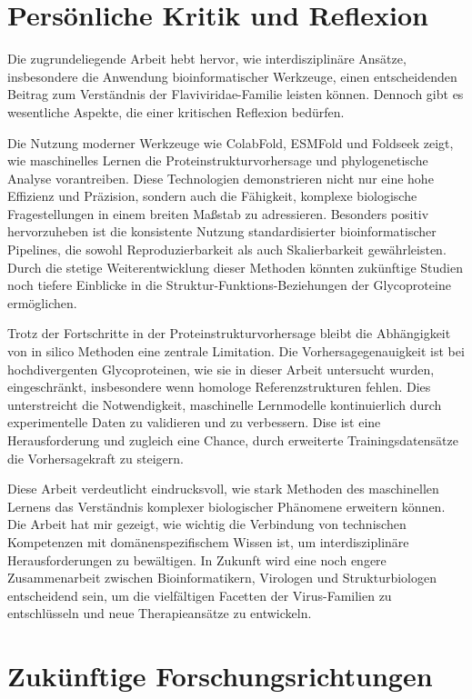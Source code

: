 \section{Persönliche Kritik und Reflexion} \label{sec:persoenliche-kritik}

Die zugrundeliegende Arbeit hebt hervor, wie interdisziplinäre Ansätze, insbesondere die Anwendung bioinformatischer Werkzeuge, einen entscheidenden Beitrag zum Verständnis der Flaviviridae-Familie leisten können. Dennoch gibt es wesentliche Aspekte, die einer kritischen Reflexion bedürfen.

Die Nutzung moderner Werkzeuge wie ColabFold, ESMFold und Foldseek zeigt, wie maschinelles Lernen die Proteinstrukturvorhersage und phylogenetische Analyse vorantreiben. Diese Technologien demonstrieren nicht nur eine hohe Effizienz und Präzision, sondern auch die Fähigkeit, komplexe biologische Fragestellungen in einem breiten Maßstab zu adressieren. Besonders positiv hervorzuheben ist die konsistente Nutzung standardisierter bioinformatischer Pipelines, die sowohl Reproduzierbarkeit als auch Skalierbarkeit gewährleisten. Durch die stetige Weiterentwicklung dieser Methoden könnten zukünftige Studien noch tiefere Einblicke in die Struktur-Funktions-Beziehungen der Glycoproteine ermöglichen.

Trotz der Fortschritte in der Proteinstrukturvorhersage bleibt die Abhängigkeit von in silico Methoden eine zentrale Limitation. Die Vorhersagegenauigkeit ist bei hochdivergenten Glycoproteinen, wie sie in dieser Arbeit untersucht wurden, eingeschränkt, insbesondere wenn homologe Referenzstrukturen fehlen. Dies unterstreicht die Notwendigkeit, maschinelle Lernmodelle kontinuierlich durch experimentelle Daten zu validieren und zu verbessern. Dise ist eine Herausforderung und zugleich eine Chance, durch erweiterte Trainingsdatensätze die Vorhersagekraft zu steigern.

Diese Arbeit verdeutlicht eindrucksvoll, wie stark Methoden des maschinellen Lernens das Verständnis komplexer biologischer Phänomene erweitern können. Die Arbeit hat mir gezeigt, wie wichtig die Verbindung von technischen Kompetenzen mit domänenspezifischem Wissen ist, um interdisziplinäre Herausforderungen zu bewältigen. In Zukunft wird eine noch engere Zusammenarbeit zwischen Bioinformatikern, Virologen und Strukturbiologen entscheidend sein, um die vielfältigen Facetten der Virus-Familien zu entschlüsseln und neue Therapieansätze zu entwickeln.

\section{Zukünftige Forschungsrichtungen} \label{sec:zukuenftige-forschung}

